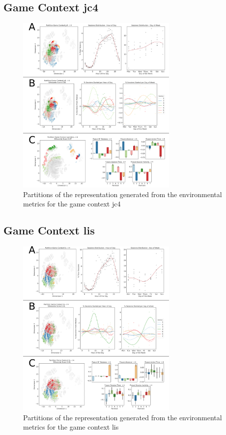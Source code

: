 \subsection{Game Context jc4}
\label{env_clust_jc4}

\begin{figure}[ht]
\includegraphics[width=0.7\textwidth]{images/appendix_D/clust_env_jc4.png}
\centering
\caption[Partitions of the representation generated from the environmental metrics for the game context jc4]{Partitions of the representation generated from the environmental metrics for the game context jc4}
\end{figure}
\FloatBarrier

\subsection{Game Context lis}
\label{env_clust_jc3}

\begin{figure}[ht]
\includegraphics[width=0.7\textwidth]{images/appendix_D/clust_env_lis.png}
\centering
\caption[Partitions of the representation generated from the environmental metrics for the game context lis]{Partitions of the representation generated from the environmental metrics for the game context lis}
\end{figure}
\FloatBarrier

